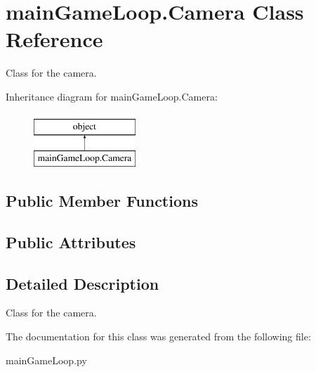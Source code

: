 \hypertarget{classmain_game_loop_1_1_camera}{}\section{main\+Game\+Loop.\+Camera Class Reference}
\label{classmain_game_loop_1_1_camera}


Class for the camera.  


Inheritance diagram for main\+Game\+Loop.\+Camera\+:\begin{figure}[H]
\begin{center}
\leavevmode
\includegraphics[height=2.000000cm]{classmain_game_loop_1_1_camera}
\end{center}
\end{figure}
\subsection*{Public Member Functions}
\begin{DoxyCompactItemize}
\end{DoxyCompactItemize}
\subsection*{Public Attributes}
\begin{DoxyCompactItemize}
\end{DoxyCompactItemize}


\subsection{Detailed Description}
Class for the camera. 

The documentation for this class was generated from the following file\+:\begin{DoxyCompactItemize}
\item 
main\+Game\+Loop.\+py\end{DoxyCompactItemize}
